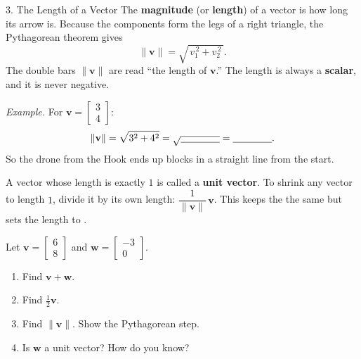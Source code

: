 \documentclass[10pt]{article}
\newcommand{\vv}{\mathbf{v}}
\newcommand{\ww}{\mathbf{w}}
\begin{document}
\boxguard
\begin{notesbox}{3. The Length of a Vector}
The \textbf{magnitude} (or \textbf{length}) of a vector is how long its arrow is. Because
the components form the legs of a right triangle, the Pythagorean theorem gives
\[
  \|\vv\| = \sqrt{\,v_1^{\,2} + v_2^{\,2}\,}.
\]
The double bars $\|\vv\|$ are read ``the length of $\vv$.'' The length is always a
\textbf{scalar}, and it is never negative.

\vspace{2pt}
\textit{Example.} For $\vv = \begin{bmatrix} 3 \\ 4 \end{bmatrix}$:
\[
  \|\vv\| = \sqrt{3^2 + 4^2} = \sqrt{\blank{1.4cm}} = \blank{1.4cm}.
\]
So the drone from the Hook ends up \blank{2.2cm} blocks in a straight line from the start.

\vspace{4pt}
A vector whose length is exactly $1$ is called a \textbf{unit vector}. To shrink any
vector to length $1$, divide it by its own length: $\dfrac{1}{\|\vv\|}\,\vv$. This keeps
the \blank{3.0cm} the same but sets the length to \blank{1.2cm}.
\end{notesbox}

\boxguard
\begin{practicebox}
Let $\vv = \begin{bmatrix} 6 \\ 8 \end{bmatrix}$ and $\ww = \begin{bmatrix} -3 \\ 0 \end{bmatrix}$.
\begin{enumerate}[leftmargin=1.6em]
  \item Find $\vv + \ww$. \hfill \blank{4.5cm}
  \item Find $\tfrac{1}{2}\vv$. \hfill \blank{4.5cm}
  \item Find $\|\vv\|$. Show the Pythagorean step. \writeline
  \item Is $\ww$ a unit vector? How do you know? \writeline
\end{enumerate}
\end{practicebox}
\end{document}
